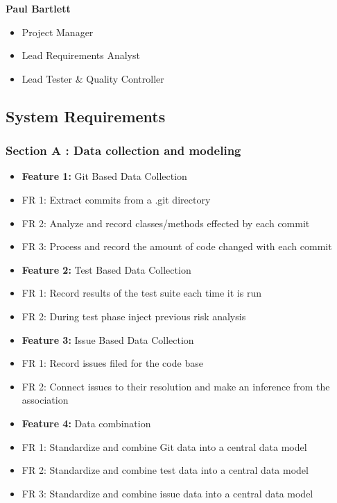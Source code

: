 \documentclass[11pt,]{article}
\begin{document}
\textbf{Paul Bartlett}

\begin{itemize}
\item
  Project Manager
\item
  Lead Requirements Analyst
\item
  Lead Tester \& Quality Controller
\end{itemize}

\subsection{System Requirements}\label{system-requirements}

\subsubsection{Section A : Data collection and
modeling}\label{section-a-data-collection-and-modeling}

\begin{itemize}
\item
  \textbf{Feature 1:} Git Based Data Collection
\item
  FR 1: Extract commits from a .git directory
\item
  FR 2: Analyze and record classes/methods effected by each commit
\item
  FR 3: Process and record the amount of code changed with each commit
\item
  \textbf{Feature 2:} Test Based Data Collection
\item
  FR 1: Record results of the test suite each time it is run
\item
  FR 2: During test phase inject previous risk analysis
\item
  \textbf{Feature 3:} Issue Based Data Collection
\item
  FR 1: Record issues filed for the code base
\item
  FR 2: Connect issues to their resolution and make an inference from
  the association
\item
  \textbf{Feature 4:} Data combination
\item
  FR 1: Standardize and combine Git data into a central data model
\item
  FR 2: Standardize and combine test data into a central data model
\item
  FR 3: Standardize and combine issue data into a central data model
\end{itemize}
\end{document}

